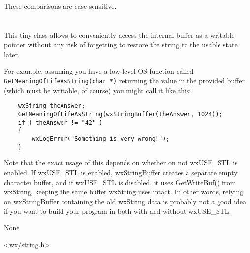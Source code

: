 





These comparisons are case-sensitive.


\section{}\label{wxstringbuffer}

This tiny class allows to conveniently access the  
internal buffer as a writable pointer without any risk of forgetting to restore
the string to the usable state later.

For example, assuming you have a low-level OS function called 
{\tt GetMeaningOfLifeAsString(char *)} returning the value in the provided
buffer (which must be writable, of course) you might call it like this:

\begin{verbatim}
    wxString theAnswer;
    GetMeaningOfLifeAsString(wxStringBuffer(theAnswer, 1024));
    if ( theAnswer != "42" )
    {
        wxLogError("Something is very wrong!");
    }
\end{verbatim}

Note that the exact usage of this depends on whether on not wxUSE\_STL is enabled.  If
wxUSE\_STL is enabled, wxStringBuffer creates a separate empty character buffer, and
if wxUSE\_STL is disabled, it uses GetWriteBuf() from wxString, keeping the same buffer
wxString uses intact.  In other words, relying on wxStringBuffer containing the old 
wxString data is probably not a good idea if you want to build your program in both
with and without wxUSE\_STL.


None


<wx/string.h>



